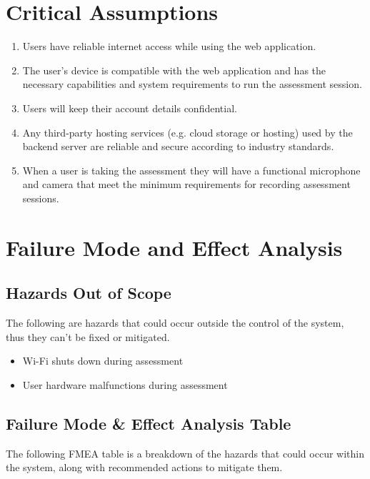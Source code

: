 \documentclass{article}
\begin{document}
\section{Critical Assumptions}
\begin{enumerate}
    \item Users have reliable internet access while using the web application.
    \item The user's device is compatible with the web application and has the necessary capabilities and system requirements to run the assessment session.
    \item Users will keep their account details confidential.
    \item Any third-party hosting services (e.g. cloud storage or hosting) used by the backend server are reliable and secure according to industry standards.
    \item When a user is taking the assessment they will have a functional microphone and camera that meet the minimum requirements for recording assessment sessions.
\end{enumerate}

\section{Failure Mode and Effect Analysis}
\subsection{Hazards Out of Scope}
The following are hazards that could occur outside the control of the system, thus they can't be fixed or mitigated.
\begin{itemize}
    \item Wi-Fi shuts down during assessment
    \item User hardware malfunctions during assessment
\end{itemize}
\subsection{Failure Mode \& Effect Analysis Table}
The following FMEA table is a breakdown of the hazards that could occur within the system, along with recommended actions to mitigate them.
\end{document}
